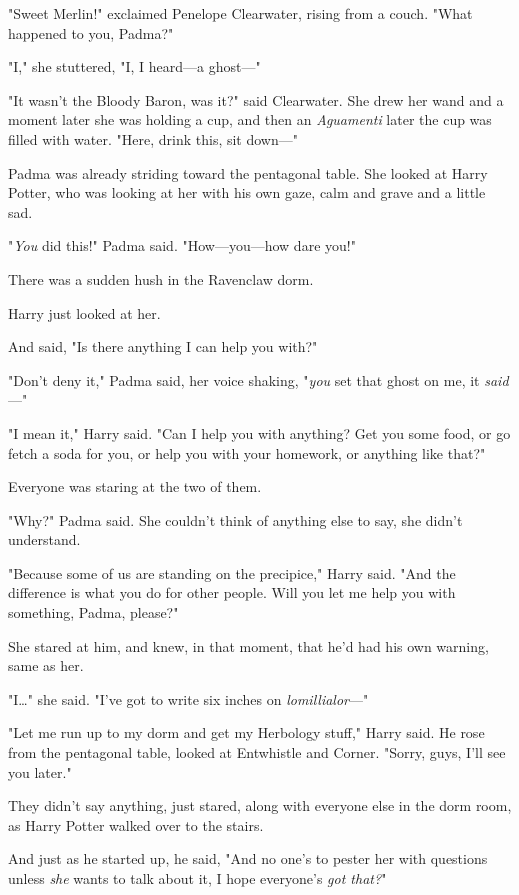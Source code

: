 "Sweet Merlin!" exclaimed Penelope Clearwater, rising from a couch. "What
happened to you, Padma?"

"I," she stuttered, "I, I heard—a ghost—"

"It wasn’t the Bloody Baron, was it?" said Clearwater. She drew her wand and a
moment later she was holding a cup, and then an \emph{Aguamenti} later the cup
was filled with water. "Here, drink this, sit down—"

Padma was already striding toward the pentagonal table. She looked at Harry
Potter, who was looking at her with his own gaze, calm and grave and a little
sad.

"\emph{You} did this!" Padma said. "How—you—how dare you!"

There was a sudden hush in the Ravenclaw dorm.

Harry just looked at her.

And said, "Is there anything I can help you with?"

"Don’t deny it," Padma said, her voice shaking, "\emph{you} set that ghost on
me, it \emph{said}—"

"I mean it," Harry said. "Can I help you with anything? Get you some food, or
go fetch a soda for you, or help you with your homework, or anything like that?"

Everyone was staring at the two of them.

"Why?" Padma said. She couldn’t think of anything else to say, she didn’t
understand.

"Because some of us are standing on the precipice," Harry said. "And the
difference is what you do for other people. Will you let me help you with
something, Padma, please?"

She stared at him, and knew, in that moment, that he’d had his own warning,
same as her.

"I…" she said. "I’ve got to write six inches on \emph{lomillialor}—"

"Let me run up to my dorm and get my Herbology stuff," Harry said. He rose
from the pentagonal table, looked at Entwhistle and Corner. "Sorry, guys, I’ll
see you later."

They didn’t say anything, just stared, along with everyone else in the dorm
room, as Harry Potter walked over to the stairs.

And just as he started up, he said, "And no one’s to pester her with questions
unless \emph{she} wants to talk about it, I hope everyone’s \emph{got that?}"

